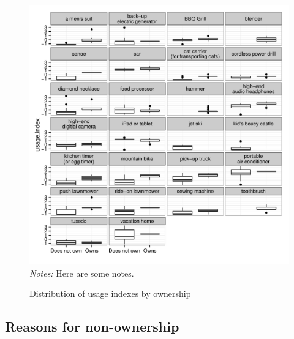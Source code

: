 \documentclass[11pt]{article}
\begin{document}
\begin{figure}
\centering 
\caption{Distribution of usage indexes by ownership}
\label{fig:usage_by_own}
\begin{minipage}{0.90 \linewidth}
\includegraphics[width = \linewidth]{./plots/usage_by_own.pdf} 
\\
{\footnotesize
\emph{Notes:} Here are some notes. 
}
\end{minipage} 
\end{figure} 

\subsection{Reasons for non-ownership} 
\end{document}
